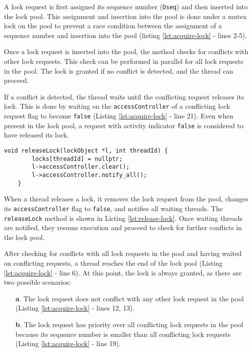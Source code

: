 A lock request is first assigned its sequence number (\texttt{Oseq}) and then inserted into the lock pool. This assignment and insertion into the pool is done under a mutex lock on the pool to prevent a race condition between the assignment of a sequence number and insertion into the pool (listing \ref{lst:acquire-lock} - lines 2-5).

Once a lock request is inserted into the pool, the method checks for conflicts with other lock requests. This check can be performed in parallel for all lock requests in the pool. The lock is granted if no conflict is detected, and the thread can proceed.

If a conflict is detected, the thread waits until the conflicting request releases its lock. This is done by waiting on the \texttt{accessController} of a conflicting lock request flag to become \texttt{false} (Listing \ref{lst:acquire-lock} - line 21). Even when present in the lock pool, a request with activity indicator \texttt{false} is considered to have released its lock.


\begin{lstlisting}[caption={Releasing a lock}, label={lst:release-lock}]
    void releaseLock(lockObject *l, int threadId) {
        locks[threadId] = nullptr;
        l->accessController.clear();
        l->accessController.notify_all();
    }
\end{lstlisting}

When a thread releases a lock, it removes the lock request from the pool, changes its \texttt{accessController} flag to \texttt{false}, and notifies all waiting threads. The \texttt{releaseLock} method is shown in Listing \ref{lst:release-lock}. Once waiting threads are notified, they resume execution and proceed to check for further conflicts in the lock pool.


After checking for conflicts with all lock requests in the pool and having waited on conflicting requests, a thread reaches the end of the lock pool (Listing \ref{lst:acquire-lock} - line 6). At this point, the lock is always granted, as there are two possible scenarios:

\begin{enumerate}
    \item[\textbf{a}.] The lock request does not conflict with any other lock request in the pool (Listing \ref{lst:acquire-lock} - lines 12, 13).
    \item[\textbf{b}.] The lock request has priority over all conflicting lock requests in the pool because its sequence number is smaller than all conflicting lock requests (Listing \ref{lst:acquire-lock} - line 19). 
\end{enumerate}



